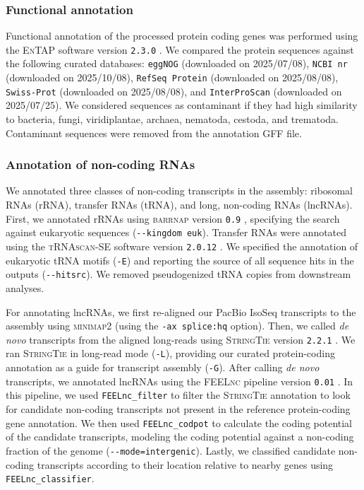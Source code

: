 \subsubsection*{Functional annotation}

Functional annotation of the processed protein coding genes was performed using the
\textsc{EnTAP} software version \texttt{2.3.0} \citep{hart_span_2020}.
We compared the \bgla{} protein sequences against the following curated databases:
\texttt{eggNOG} (downloaded on 2025/07/08), \texttt{NCBI nr} (downloaded on 2025/10/08),
\texttt{RefSeq Protein} (downloaded on 2025/08/08), \texttt{Swiss-Prot}
(downloaded on 2025/08/08), and \texttt{InterProScan} (downloaded on 2025/07/25).
We considered sequences as contaminant if they had high similarity to bacteria, fungi,
viridiplantae, archaea, nematoda, cestoda, and trematoda.
Contaminant sequences were removed from the annotation GFF file.

\subsubsection*{Annotation of non-coding RNAs}\label{sec:methods_ncrna}

We annotated three classes of non-coding transcripts in the \bgla{} assembly: ribosomal
RNAs (rRNA), transfer RNAs (tRNA), and long, non-coding RNAs (lncRNAs). First, we annotated
rRNAs using \textsc{barrnap} version \texttt{0.9} \citep{seemann_barrnap_2018}, specifying
the search against eukaryotic sequences (\texttt{-{}-kingdom euk}). Transfer RNAs were
annotated using the \textsc{tRNAscan-SE} software version \texttt{2.0.12}
\citep{chan_trnascan-se_2021}. We specified the annotation of eukaryotic tRNA motifs
(\texttt{-E}) and reporting the source of all sequence hits in the outputs
(\texttt{-{}-hitsrc}). We removed pseudogenized tRNA copies from downstream analyses.
\vspace{0.1cm}

For annotating lncRNAs, we first re-aligned our PacBio IsoSeq transcripts to the
assembly using \textsc{minimap2} (using the \texttt{-ax splice:hq} option). Then, we
called \textit{de novo} transcripts from the aligned long-reads using \textsc{StringTie}
version \texttt{2.2.1} \citep{shumate_improved_2022,kovaka_transcriptome_2019}. We ran
\textsc{StringTie} in long-read mode (\texttt{-L}), providing our curated protein-coding
annotation as a guide for transcript assembly (\texttt{-G}). After calling \textit{de novo}
transcripts, we annotated lncRNAs using the \textsc{FEELnc} pipeline version \texttt{0.01}
\citep{wucher_feelnc_2017}. In this pipeline, we used \texttt{FEELnc\_filter} to filter
the \textsc{StringTie} annotation to look for candidate non-coding transcripts not
present in the reference protein-coding gene annotation. We then used
\texttt{FEELnc\_codpot} to calculate the coding potential of the candidate transcripts,
modeling the coding potential against a non-coding fraction of the genome
(\texttt{-{}-mode=intergenic}). Lastly, we classified candidate non-coding transcripts
according to their location relative to nearby genes using \texttt{FEELnc\_classifier}.
\vspace{0.1cm}

